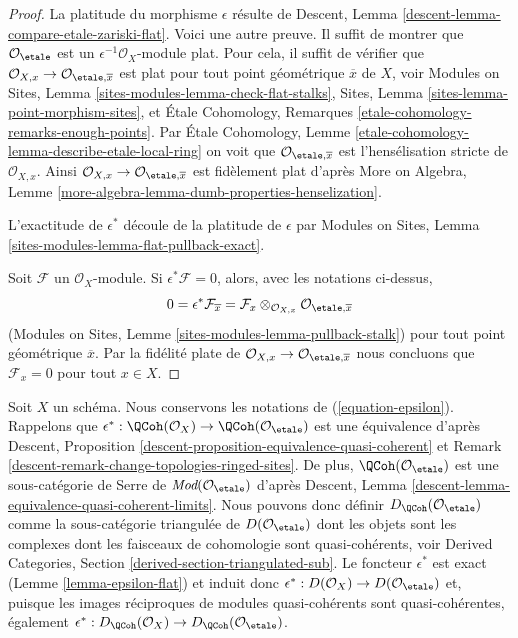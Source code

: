 \begin{proof}
La platitude du morphisme $\epsilon$ résulte de
Descent, Lemma \ref{descent-lemma-compare-etale-zariski-flat}.
Voici une autre preuve. Il suffit de montrer que
$\mathcal{O}_\etale$ est un $\epsilon^{-1}\mathcal{O}_X$-module plat.
Pour cela, il suffit de vérifier que
$\mathcal{O}_{X, x} \to \mathcal{O}_{\etale, \overline{x}}$
est plat pour tout point géométrique $\overline{x}$ de $X$, voir
Modules on Sites, Lemma
\ref{sites-modules-lemma-check-flat-stalks},
Sites, Lemma
\ref{sites-lemma-point-morphism-sites},
et
\'Etale Cohomology, Remarques
\ref{etale-cohomology-remarks-enough-points}.
Par \'Etale Cohomology, Lemme
\ref{etale-cohomology-lemma-describe-etale-local-ring}
on voit que $\mathcal{O}_{\etale, \overline{x}}$ est l'hensélisation
stricte de $\mathcal{O}_{X, x}$. Ainsi
$\mathcal{O}_{X, x} \to \mathcal{O}_{\etale, \overline{x}}$
est fidèlement plat d'après More on Algebra,
Lemme \ref{more-algebra-lemma-dumb-properties-henselization}.

\medskip\noindent
L'exactitude de $\epsilon^*$ découle de la platitude
de $\epsilon$ par
Modules on Sites, Lemma \ref{sites-modules-lemma-flat-pullback-exact}.

\medskip\noindent
Soit $\mathcal{F}$ un $\mathcal{O}_X$-module. Si
$\epsilon^*\mathcal{F} = 0$, alors, avec les notations ci-dessus,
$$
0 = \epsilon^*\mathcal{F}_{\overline{x}} =
\mathcal{F}_x \otimes_{\mathcal{O}_{X, x}} \mathcal{O}_{\etale, \overline{x}}
$$
(Modules on Sites, Lemme \ref{sites-modules-lemma-pullback-stalk})
pour tout point géométrique $\overline{x}$. Par la fidélité plate de
$\mathcal{O}_{X, x} \to \mathcal{O}_{\etale, \overline{x}}$
nous concluons que $\mathcal{F}_x = 0$ pour tout $x \in X$.
\end{proof}

\noindent
Soit $X$ un schéma. Nous conservons les notations de (\ref{equation-epsilon}).
Rappelons que $\epsilon^* : \QCoh(\mathcal{O}_X)
\to \QCoh(\mathcal{O}_\etale)$
est une équivalence d'après
Descent, Proposition \ref{descent-proposition-equivalence-quasi-coherent} et
Remark \ref{descent-remark-change-topologies-ringed-sites}.
De plus, $\QCoh(\mathcal{O}_\etale)$ est une sous-catégorie de Serre de
$\textit{Mod}(\mathcal{O}_\etale)$ d'après
Descent, Lemma \ref{descent-lemma-equivalence-quasi-coherent-limits}.
Nous pouvons donc définir $D_\QCoh(\mathcal{O}_\etale)$ comme la sous-catégorie
triangulée de $D(\mathcal{O}_\etale)$ dont les objets sont les complexes
dont les faisceaux de cohomologie sont quasi-cohérents, voir
Derived Categories, Section \ref{derived-section-triangulated-sub}.
Le foncteur $\epsilon^*$ est exact (Lemme \ref{lemma-epsilon-flat})
et induit donc
$\epsilon^* :  D(\mathcal{O}_X) \to D(\mathcal{O}_\etale)$
et, puisque les images réciproques de modules quasi-cohérents sont quasi-cohérentes,
également $\epsilon^* : D_\QCoh(\mathcal{O}_X) \to
D_\QCoh(\mathcal{O}_\etale)$.

